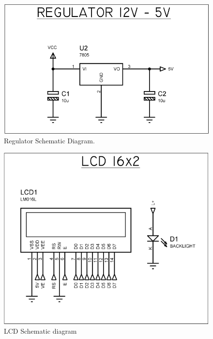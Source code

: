 \documentclass[journal]{IEEEtran}
\begin{document}
\begin{figure}[!ht]%
  \includegraphics[scale=0.40]{regulator.png}
  \centering
  \caption{Regulator Schematic Diagram.}
\end{figure}

\begin{figure}[!ht]%
  \includegraphics[scale=0.49]{lcd.png}
  \centering
  \caption{LCD Schematic diagram}
\end{figure}
\end{document}
